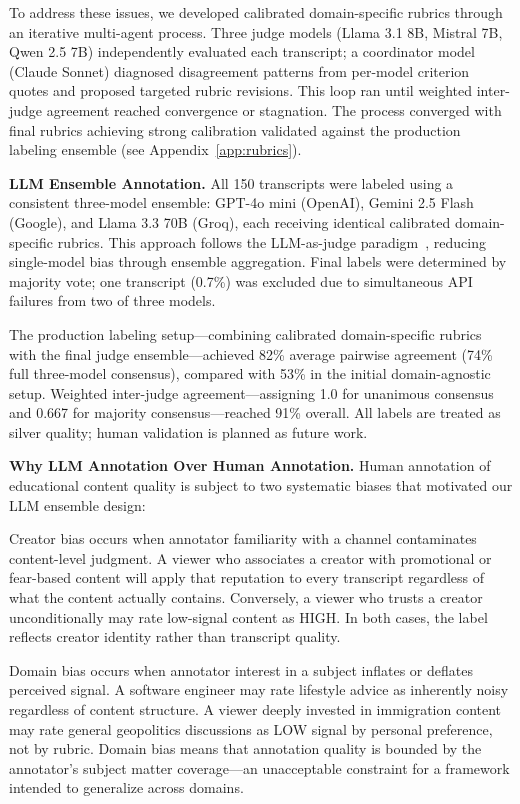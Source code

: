 \documentclass[11pt,a4paper]{article}
\begin{document}
To address these issues, we developed calibrated domain-specific rubrics through an iterative
multi-agent process. Three judge models (Llama 3.1 8B, Mistral 7B, Qwen 2.5 7B) independently
evaluated each transcript; a coordinator model (Claude Sonnet) diagnosed disagreement patterns
from per-model criterion quotes and proposed targeted rubric revisions. This loop ran until
weighted inter-judge agreement reached convergence or stagnation. The process converged with
final rubrics achieving strong calibration validated against the production labeling ensemble
(see Appendix~\ref{app:rubrics}).

\textbf{LLM Ensemble Annotation.} All 150 transcripts were labeled using a consistent
three-model ensemble: GPT-4o mini (OpenAI), Gemini 2.5 Flash (Google), and Llama 3.3 70B
(Groq), each receiving identical calibrated domain-specific rubrics. This approach follows the
LLM-as-judge paradigm~\cite{zheng2023}, reducing single-model bias through ensemble aggregation.
Final labels were determined by majority vote; one transcript (0.7\%) was excluded due to
simultaneous API failures from two of three models.

The production labeling setup---combining calibrated domain-specific rubrics with the final
judge ensemble---achieved 82\% average pairwise agreement (74\% full three-model consensus),
compared with 53\% in the initial domain-agnostic setup. Weighted inter-judge agreement---assigning 1.0 for unanimous consensus
and 0.667 for majority consensus---reached 91\% overall. All labels are treated as silver
quality; human validation is planned as future work.

\textbf{Why LLM Annotation Over Human Annotation.} Human annotation of educational content
quality is subject to two systematic biases that motivated our LLM ensemble design:

Creator bias occurs when annotator familiarity with a channel contaminates content-level
judgment. A viewer who associates a creator with promotional or fear-based content will apply
that reputation to every transcript regardless of what the content actually contains.
Conversely, a viewer who trusts a creator unconditionally may rate low-signal content as HIGH.
In both cases, the label reflects creator identity rather than transcript quality.

Domain bias occurs when annotator interest in a subject inflates or deflates perceived signal.
A software engineer may rate lifestyle advice as inherently noisy regardless of content
structure. A viewer deeply invested in immigration content may rate general geopolitics
discussions as LOW signal by personal preference, not by rubric. Domain bias means that
annotation quality is bounded by the annotator's subject matter coverage---an unacceptable
constraint for a framework intended to generalize across domains.
\end{document}
